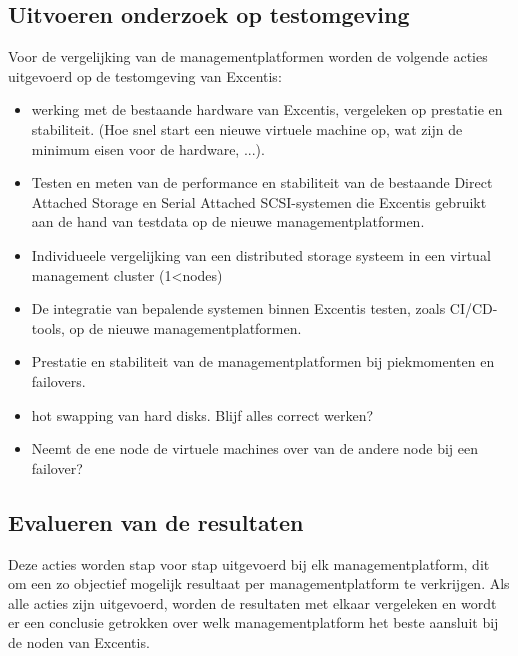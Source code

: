 \subsection{Uitvoeren onderzoek op testomgeving}
Voor de vergelijking van de managementplatformen worden de volgende acties uitgevoerd op de testomgeving van Excentis:
\begin{itemize}
\item werking met de bestaande hardware van Excentis, vergeleken op prestatie en stabiliteit. (Hoe snel start een nieuwe virtuele machine op, wat zijn de minimum eisen voor de hardware, ...).
\item Testen en meten van de performance en stabiliteit van de bestaande Direct Attached Storage en Serial Attached SCSI-systemen die Excentis gebruikt aan de hand van testdata op de nieuwe managementplatformen.
\item Individueele vergelijking van een distributed storage systeem in een virtual management cluster (1<nodes)
\item De integratie van bepalende systemen binnen Excentis testen, zoals CI/CD-tools, op de nieuwe managementplatformen.
\item Prestatie en stabiliteit van de managementplatformen bij piekmomenten en failovers.
\item hot swapping van hard disks. Blijf alles correct werken? 
\item Neemt de ene node de virtuele machines over van de andere node bij een failover?
\end{itemize}

\subsection{Evalueren van de resultaten}
Deze acties worden stap voor stap uitgevoerd bij elk managementplatform, dit om een zo objectief mogelijk resultaat per managementplatform te verkrijgen.
Als alle acties zijn uitgevoerd, worden de resultaten met elkaar vergeleken en wordt er een conclusie getrokken over welk managementplatform het beste aansluit bij de noden van Excentis.